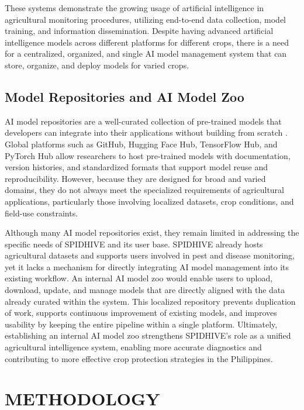 \documentclass{icsthesis}
\begin{document}
\begin{mainmatter}
            These systems demonstrate the growing usage of artificial intelligence in agricultural monitoring procedures, utilizing end-to-end data collection, model training, and information dissemination. Despite having advanced artificial intelligence models across different platforms for different crops, there is a need for a centralized, organized, and single AI model management system that can store, organize, and deploy models for varied crops.

            \subsection{Model Repositories and AI Model Zoo} 
            AI model repositories are a well-curated collection of pre-trained models that developers can integrate into their applications without building from scratch \cite{India_2025}. Global platforms such as GitHub, Hugging Face Hub, TensorFlow Hub, and PyTorch Hub allow researchers to host pre-trained models with documentation, version histories, and standardized formats that support model reuse and reproducibility. However, because they are designed for broad and varied domains, they do not always meet the specialized requirements of agricultural applications, particularly those involving localized datasets, crop conditions, and field-use constraints.

            Although many AI model repositories exist, they remain limited in addressing the specific needs of SPIDHIVE and its user base. SPIDHIVE already hosts agricultural datasets and supports users involved in pest and disease monitoring, yet it lacks a mechanism for directly integrating AI model management into its existing workflow. An internal AI model zoo would enable users to upload, download, update, and manage models that are directly aligned with the data already curated within the system. This localized repository prevents duplication of work, supports continuous improvement of existing models, and improves usability by keeping the entire pipeline within a single platform. Ultimately, establishing an internal AI model zoo strengthens SPIDHIVE’s role as a unified agricultural intelligence system, enabling more accurate diagnostics and contributing to more effective crop protection strategies in the Philippines.

        \section{METHODOLOGY}

\end{mainmatter}
\end{document}
